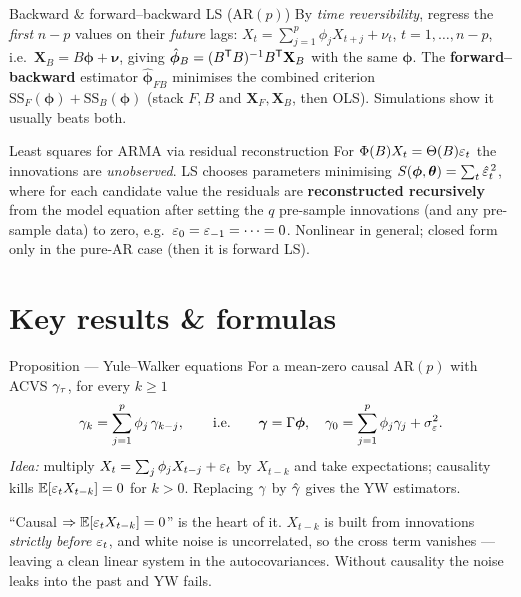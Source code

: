 \documentclass[11pt]{article}
\begin{document}
\begin{defn}{Backward \& forward--backward LS (AR$(p)$)}
By \emph{time reversibility}, regress the \emph{first} $n-p$ values on their \emph{future} lags: $X_t=\sum_{j=1}^p\phi_jX_{t+j}+\nu_t$, $t=1,\dots,n-p$, i.e.\ $\mathbf X_B=B\bm\phi+\bm\nu$, giving $\hat{\bm\phi}_B=(B^{\mathsf{T}} B)^{-1}B^{\mathsf{T}}\mathbf X_B$ with the same $\bm\phi$. The \textbf{forward--backward} estimator $\hat{\bm\phi}_{FB}$ minimises the combined criterion $\mathrm{SS}_F(\bm\phi)+\mathrm{SS}_B(\bm\phi)$ (stack $F,B$ and $\mathbf X_F,\mathbf X_B$, then OLS). Simulations show it usually beats both.
\end{defn}

\begin{defn}{Least squares for ARMA via residual reconstruction}
For $\Phi(B)X_t=\Theta(B)\varepsilon_t$ the innovations are \emph{unobserved}. LS chooses parameters minimising $S(\bm\phi,\bm\theta)=\sum_t\hat{\varepsilon}_t^{\,2}$, where for each candidate value the residuals are \textbf{reconstructed recursively} from the model equation after setting the $q$ pre-sample innovations (and any pre-sample data) to zero, e.g.\ $\varepsilon_0=\varepsilon_{-1}=\dots=0$. Nonlinear in general; closed form only in the pure-AR case (then it is forward LS).
\end{defn}

\section*{Key results \& formulas}

\begin{result}{Proposition --- Yule--Walker equations}
For a mean-zero causal AR$(p)$ with ACVS $\gamma_\tau$, for every $k\ge1$
\[
\gamma_k=\sum_{j=1}^p\phi_j\,\gamma_{k-j},\qquad\text{i.e.}\qquad
\bm{\gamma}=\Gamma\bm\phi,\quad \gamma_0=\sum_{j=1}^p\phi_j\gamma_j+\sigma_\varepsilon^2.
\]
\textit{Idea:} multiply $X_t=\sum_j\phi_jX_{t-j}+\varepsilon_t$ by $X_{t-k}$ and take expectations; causality kills $\mathbb{E}[\varepsilon_tX_{t-k}]=0$ for $k>0$. Replacing $\gamma$ by $\hat{\gamma}$ gives the YW estimators.
\end{result}

\begin{intu}
``Causal $\Rightarrow\mathbb{E}[\varepsilon_tX_{t-k}]=0$'' is the heart of it. $X_{t-k}$ is built from innovations \emph{strictly before} $\varepsilon_t$, and white noise is uncorrelated, so the cross term vanishes --- leaving a clean linear system in the autocovariances. Without causality the noise leaks into the past and YW fails.
\end{intu}
\end{document}

